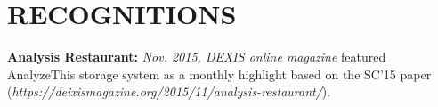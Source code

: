 \section{RECOGNITIONS}
\vspace{0.03in}

{\bf Analysis Restaurant:} \emph{Nov. 2015, DEXIS online magazine} featured
AnalyzeThis storage system as a monthly highlight based on the SC'15 paper
{\small(\emph{https://deixismagazine.org/2015/11/analysis-restaurant/})}.

